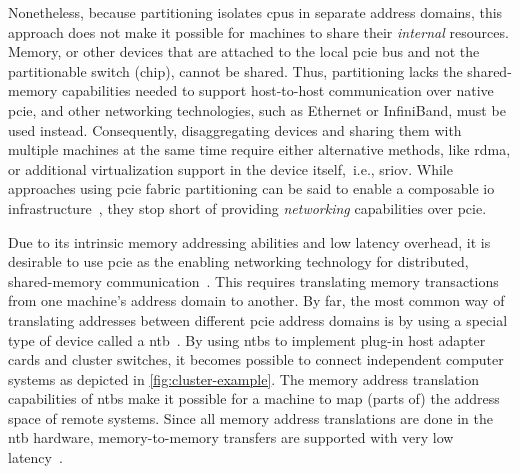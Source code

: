 Nonetheless, because partitioning isolates \glspl{cpu} in separate address domains, this approach does not make it possible for machines to share their \emph{internal} resources.
%
Memory, or other devices that are attached to the local \gls{pcie} bus and not the partitionable switch (chip), cannot be shared.
%
Thus, partitioning lacks the shared-memory capabilities needed to support host-to-host communication over native \gls{pcie}, and other networking technologies, such as Ethernet or InfiniBand, must be used instead.
%
Consequently, \gls{disaggregating} devices and sharing them with multiple machines at the same time require either alternative methods, like \gls{rdma}, or additional virtualization support in the device itself,~i.e., \gls{sriov}.
%
While approaches using \gls{pcie} fabric partitioning can be said to enable a composable \gls{io} infrastructure~\cite{Chung2018}, they stop short of providing \emph{networking} capabilities over \gls{pcie}.



Due to its intrinsic memory addressing abilities and low latency overhead, it is desirable to use \gls{pcie} as the enabling networking technology for distributed, shared-memory communication~\cite{Shim2018,whitepaper:Regula2004,url:Meduri2011}.
%
This requires translating memory transactions from one machine's address domain to another.
%
By far, the most common way of translating addresses between different \gls{pcie} address domains is by using a special type of device called a \gls{ntb}~\cite{whitepaper:PLX,whitepaper:Regula2004,Hou2013,Tu2014}.
%
%
By using \glspl{ntb} to implement plug-in host adapter cards and cluster switches, it becomes possible to connect independent computer systems as depicted in \cref{fig:cluster-example}.
%
The memory address translation capabilities of \glspl{ntb} make it possible for a machine to map (parts of) the address space of remote systems.
%
Since all memory address translations are done in the \gls{ntb} hardware, memory-to-memory transfers are supported with very low latency~\cite{Lim2019,Tu2014}.



